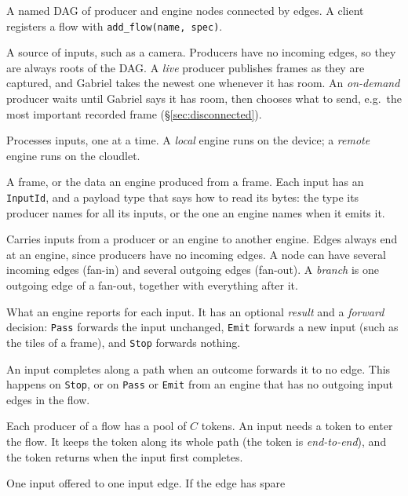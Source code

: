 \documentclass[11pt]{article}
\newcommand{\code}[1]{\texttt{#1}}
\begin{document}
\begin{description}[style=nextline, nosep, leftmargin=1.5em]
  \item[Flow] A named DAG of producer and engine nodes connected by edges. A
        client registers a flow with \code{add\_flow(name, spec)}.
  \item[Producer node] A source of inputs, such as a camera. Producers have
        no incoming edges, so they are always roots of the DAG. A \emph{live}
        producer publishes frames as they are captured, and Gabriel takes the
        newest one whenever it has room. An \emph{on-demand} producer waits
        until Gabriel says it has room, then chooses what to send, e.g.\ the
        most important recorded frame (\S\ref{sec:disconnected}).
  \item[Engine node] Processes inputs, one at a time. A \emph{local} engine
        runs on the device; a \emph{remote} engine runs on the cloudlet.
  \item[Input] A frame, or the data an engine produced from a frame. Each
        input has an \code{InputId}, and a payload type that says how to read
        its bytes: the type its producer names for all its inputs, or the one
        an engine names when it emits it.
  \item[Input edge] Carries inputs from a producer or an engine to another
        engine. Edges always end at an engine, since producers have no
        incoming edges. A node can have
        several incoming edges (fan-in) and several outgoing edges (fan-out).
        A \emph{branch} is one outgoing edge of a fan-out, together with
        everything after it.
  \item[Outcome] What an engine reports for each input. It has an optional
        \emph{result} and a \emph{forward} decision: \code{Pass} forwards the
        input unchanged, \code{Emit} forwards a new input (such as the tiles of
        a frame), and \code{Stop} forwards nothing.
  \item[Completion] An input completes along a path when an outcome forwards
        it to no edge. This happens on \code{Stop}, or on \code{Pass} or
        \code{Emit} from an engine that has no outgoing input edges in the
        flow.
  \item[Token] Each producer of a flow has a pool of $C$ tokens. An input
        needs a token to enter the flow. It keeps the token along its whole
        path (the token is \emph{end-to-end}), and the token returns when the
        input first completes.
  \item[Offer] One input offered to one input edge. If the edge has spare

\end{description}
\end{document}
